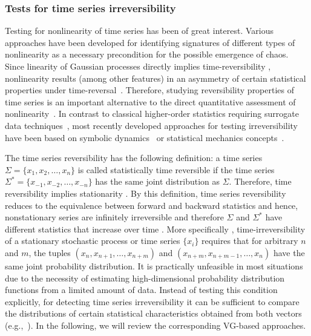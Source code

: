 		\subsubsection{Tests for time series irreversibility}
		Testing for nonlinearity of time series has been of great interest. Various approaches have been developed for identifying signatures of different types of nonlinearity as a necessary precondition for the possible emergence of chaos. Since linearity of Gaussian processes directly implies time-reversibility \cite{Weiss1975,Lawrance1991,Diks1995}, nonlinearity results (among other features) in an asymmetry of certain statistical properties under time-reversal~\cite{Theiler1992}. Therefore, studying reversibility properties of time series is an important alternative to the direct quantitative assessment of nonlinearity~\cite{Voss1998}. In contrast to classical higher-order statistics requiring surrogate data techniques~\cite{Theiler1992}, most recently developed approaches for testing irreversibility have been based on symbolic dynamics~\cite{Daw2000,Kennel2004,Cammarota2007} or statistical mechanics concepts~\cite{Costa2005,Porporato2007,Roldan2010}. 
		
		The time series reversibility has the following definition: a time series $\Sigma = \{ x_1, x_2, \dots, x_n \}$ is called statistically time reversible if the time series $\Sigma^{\ast} = \{x_{-1}, x_{-2}, \dots, x_{-n} \}$ has the same joint distribution as $\Sigma$. Therefore, time reversibility implies stationarity \cite{Lawrance1991}. By this definition, time series reversibility reduces to the equivalence between forward and backward statistics and hence, nonstationary series are infinitely irreversible and therefore $\Sigma$ and $\Sigma^{\ast}$ have different statistics that increase over time \cite{Weiss1975}. More specifically \cite{Lawrance1991}, time-{ir}reversibility of a stationary stochastic process or time series $\{x_i\}$ requires that for arbitrary $n$ and $m$, the tuples $(x_n,x_{n+1},\dots,x_{n+m})$ and $(x_{n+m},x_{n+m-1},\dots,x_n)$ have the same joint probability distribution. It is practically unfeasible in most situations due to the necessity of estimating high-dimensional probability distribution functions from a limited amount of data. Instead of testing this condition explicitly, for detecting time series irreversibility it can be sufficient to compare the distributions of certain statistical characteristics obtained from both vectors (e.g.,~\cite{Tong1990}). In the following, we will review the corresponding VG-based approaches.

